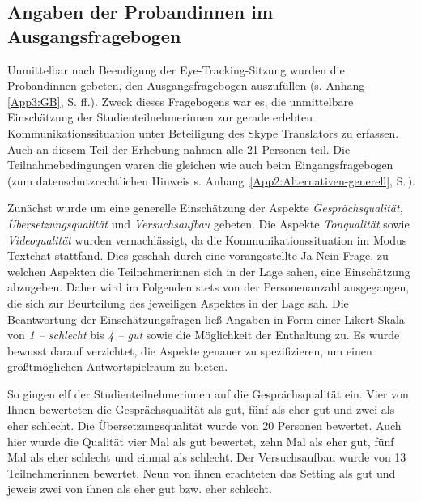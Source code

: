 

\subsection{Angaben der Proband{\textperiodcentered}innen im Ausgangsfragebogen}

\label{K6:sub:Ausgangsfragebogen:CatDe}

\begin{sloppypar}
Unmittelbar nach Beendigung der Eye-Tracking-Sitzung wurden die Proband{\textperiodcentered}\linebreak[3]innen gebeten, den Ausgangsfragebogen auszufüllen (s. Anhang \ref{App3:GB}, S.\,\pageref{App3:GB}\,ff.). Zweck dieses Fragebogens war es, die unmittelbare Einschätzung der Studienteilnehmer{\textperiodcentered}innen zur gerade erlebten Kommunikationssituation unter Beteiligung des Skype Translators zu erfassen. Auch an diesem Teil der Erhebung nahmen alle 21 Personen teil. Die Teilnahmebedingungen waren die gleichen wie auch beim Eingangsfragebogen (zum datenschutzrechtlichen Hinweis s. Anhang~\ref{App2:Alternativen-generell}, S.\,\pageref{App2:EinweisungEva}).
\end{sloppypar}

Zunächst wurde um eine generelle Einschätzung der Aspekte \emph{Gesprächsqualität}, \emph{Übersetzungsqualität} und \emph{Versuchsaufbau} gebeten. Die Aspekte \emph{Tonqualität} sowie \emph{Videoqualität} wurden vernachlässigt, da die Kommunikationssituation im Modus Textchat stattfand. Dies geschah durch eine vorangestellte Ja-Nein-Frage, zu welchen Aspekten die Teilnehmer{\textperiodcentered}innen sich in der Lage sahen, eine Einschätzung abzugeben. Daher wird im Folgenden stets von der Personenanzahl ausgegangen, die sich zur Beurteilung des jeweiligen Aspektes in der Lage sah. Die Beantwortung der Einschätzungsfragen ließ Angaben in Form einer Likert-Skala von \emph{1 – schlecht} bis \emph{4 – gut} sowie die Möglichkeit der Enthaltung zu. Es wurde bewusst darauf verzichtet, die Aspekte genauer zu spezifizieren, um einen größtmöglichen Antwortspielraum zu bieten.

So gingen elf der Studienteilnehmer{\textperiodcentered}innen auf die Gesprächsqualität ein. Vier von Ihnen bewerteten die Gesprächsqualität als gut, fünf als eher gut und zwei als eher schlecht. Die Übersetzungsqualität wurde von 20 Personen bewertet. Auch hier wurde die Qualität vier Mal als gut bewertet, zehn Mal als eher gut, fünf Mal als eher schlecht und einmal als schlecht. Der Versuchsaufbau wurde von 13 Teilnehmer{\textperiodcentered}innen bewertet. Neun von ihnen erachteten das Setting als gut und jeweis zwei von ihnen als eher gut bzw. eher schlecht.


